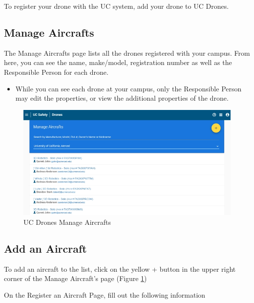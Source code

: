 \documentclass[
  12pt,
]{book}
\providecommand{\tightlist}{%
  \setlength{\itemsep}{0pt}\setlength{\parskip}{0pt}}
\begin{document}
To register your drone with the UC system, add your drone to UC Drones.

\hypertarget{manag-aircraft}{%
\subsection{Manage Aircrafts}\label{manag-aircraft}}

The Manage Aircrafts page lists all the drones registered with your campus. From here, you can see the name, make/model, registration number as well as the Responsible Person for each drone.

\begin{itemize}
\tightlist
\item
  While you can see each drone at your campus, only the Responsible Person may edit the properties, or view the additional properties of the drone.
\end{itemize}

\begin{figure}

{\centering \includegraphics[width=0.95\linewidth]{images/UCDrones_manage_drones} 

}

\caption{UC Drones Manage Aircrafts}\label{fig:UCDrones-manage-aircrafts}
\end{figure}

\hypertarget{add-an-aircraft}{%
\subsection{Add an Aircraft}\label{add-an-aircraft}}

To add an aircraft to the list, click on the yellow + button in the upper right corner of the Manage Aircraft's page (Figure \ref{fig:UCDrones-manage-aircrafts})

On the Register an Aircraft Page, fill out the following information
\end{document}
